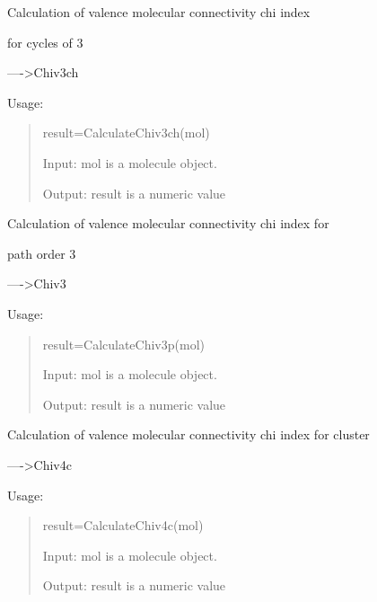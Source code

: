 \documentclass[letterpaper,10pt,english]{sphinxmanual}
\begin{document}

\begin{fulllineitems}
\label{reference/connectivity:connectivity.CalculateChiv3ch}
Calculation of valence molecular connectivity chi index

for cycles of 3

----\textgreater{}Chiv3ch

Usage:
\begin{quote}

result=CalculateChiv3ch(mol)

Input: mol is a molecule object.

Output: result is a numeric value
\end{quote}

\end{fulllineitems}


\begin{fulllineitems}
\label{reference/connectivity:connectivity.CalculateChiv3p}
Calculation of valence molecular connectivity chi index for

path order 3

----\textgreater{}Chiv3

Usage:
\begin{quote}

result=CalculateChiv3p(mol)

Input: mol is a molecule object.

Output: result is a numeric value
\end{quote}

\end{fulllineitems}


\begin{fulllineitems}
\label{reference/connectivity:connectivity.CalculateChiv4c}
Calculation of valence molecular connectivity chi index for cluster

----\textgreater{}Chiv4c

Usage:
\begin{quote}

result=CalculateChiv4c(mol)

Input: mol is a molecule object.

Output: result is a numeric value
\end{quote}

\end{fulllineitems}
\end{document}

